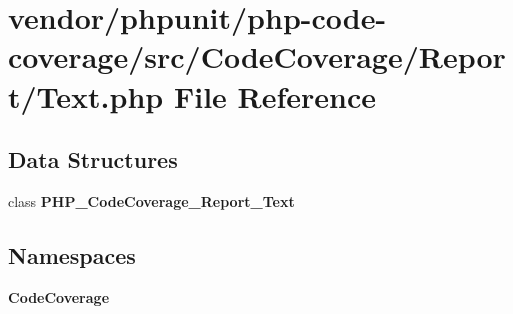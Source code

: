 \section{vendor/phpunit/php-\/code-\/coverage/src/\+Code\+Coverage/\+Report/\+Text.php File Reference}
\label{php-code-coverage_2src_2_code_coverage_2_report_2_text_8php}
\subsection*{Data Structures}
\begin{DoxyCompactItemize}
\item 
class {\bf P\+H\+P\+\_\+\+Code\+Coverage\+\_\+\+Report\+\_\+\+Text}
\end{DoxyCompactItemize}
\subsection*{Namespaces}
\begin{DoxyCompactItemize}
\item 
 {\bf Code\+Coverage}
\end{DoxyCompactItemize}
